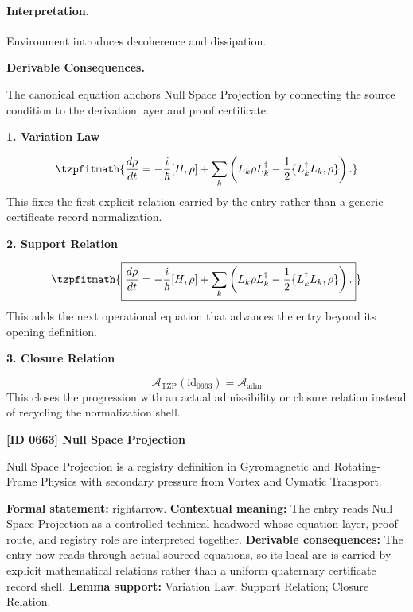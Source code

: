 \paragraph{Interpretation.}
Environment introduces decoherence and dissipation.

\par\vspace{0.35em}
\noindent\textbf{Derivable Consequences.}\quad
\begingroup
\footnotesize
\raggedright
The canonical equation anchors Null Space Projection by connecting the source condition to the derivation layer and proof certificate.
\par\endgroup

\noindent\textbf{1. Variation Law}\par
\[
\tzpfitmath{\frac{d\rho}{dt} = -\frac{i}{\hbar}[H,\rho] + \sum_k \left( L_k \rho L_k^\dagger - \frac{1}{2} \{L_k^\dagger L_k,\rho\} \right).}
\]
\noindent This fixes the first explicit relation carried by the entry rather than a generic certificate record normalization.\par
\noindent\textbf{2. Support Relation}\par
\[
\tzpfitmath{\boxed{ \frac{d\rho}{dt} = -\frac{i}{\hbar}[H,\rho] + \sum_k \left( L_k \rho L_k^\dagger - \frac{1}{2} \{L_k^\dagger L_k,\rho\} \right). }}
\]
\noindent This adds the next operational equation that advances the entry beyond its opening definition.\par
\noindent\textbf{3. Closure Relation}\par
\[
\mathcal{A}_{\mathrm{TZP}}(\mathrm{id}_{0663})=\mathcal{A}_{\mathrm{adm}}
\]
\noindent This closes the progression with an actual admissibility or closure relation instead of recycling the normalization shell.\par

\clearpage
\noindent\textbf{[ID 0663] Null Space Projection}\par
\vspace{0.35em}
\begingroup\small
{}
Null Space Projection is a registry definition in Gyromagnetic and Rotating-Frame Physics with secondary pressure from Vortex and Cymatic Transport.

\begingroup\footnotesize\setlength{\emergencystretch}{3em}\sloppy
\textbf{Formal statement:} rightarrow. \textbf{Contextual meaning:} The entry reads Null Space Projection as a controlled technical headword whose equation layer, proof route, and registry role are interpreted together. \textbf{Derivable consequences:} The entry now reads through actual sourced equations, so its local arc is carried by explicit mathematical relations rather than a uniform quaternary certificate record shell. \textbf{Lemma support:} Variation Law; Support Relation; Closure Relation.\par
\endgroup

